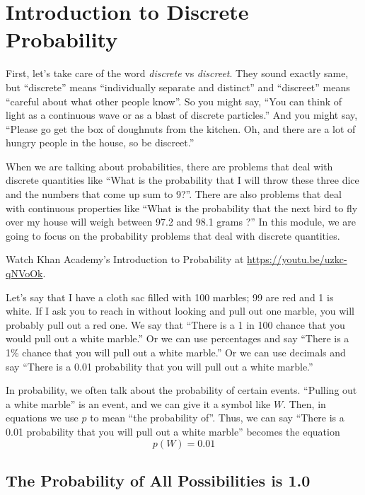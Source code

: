 \chapter{Introduction to Discrete Probability}

First, let's take care of the word \emph{discrete} vs \emph{discreet}.
They sound exactly same, but ``discrete'' means ``individually
separate and distinct'' and ``discreet'' means ``careful about what
other people know''.  So you might say, ``You can think of light as a
continuous wave or as a blast of discrete particles.'' And you might say,
``Please go get the box of doughnuts from the kitchen. Oh, and there
are a lot of hungry people in the house, so be discreet.''

When we are talking about probabilities, there are problems that deal
with discrete quantities like ``What is the probability that I will
throw these three dice and the numbers that come up sum to 9?''. There
are also problems that deal with continuous properties like ``What is
the probability that the next bird to fly over my house will weigh
between 97.2 and 98.1 grams ?'' In this module, we are going to focus
on the probability problems that deal with discrete quantities.

Watch Khan Academy's Introduction to Probability at \url{https://youtu.be/uzkc-qNVoOk}.

Let's say that I have a cloth sac filled with 100 marbles; 99 are red
and 1 is white. If I ask you to reach in without looking and pull out
one marble, you will probably pull out a red one. We say that ``There
is a 1 in 100 chance that you would pull out a white marble.'' Or we
can use percentages and say ``There is a 1\% chance that you will pull
out a white marble.'' Or we can use decimals and say ``There is a 0.01
probability that you will pull out a white marble.''

In probability, we often talk about the probability of certain
events. ``Pulling out a white marble'' is an event, and we can give it
a symbol like $W$.  Then, in equations we use $p$ to mean ``the
probability of''.  Thus, we can say ``There is a 0.01 probability that
you will pull out a white marble'' becomes the equation
\begin{equation*}
  p(W) = 0.01
\end{equation*}


\section{The Probability of All Possibilities is 1.0}


